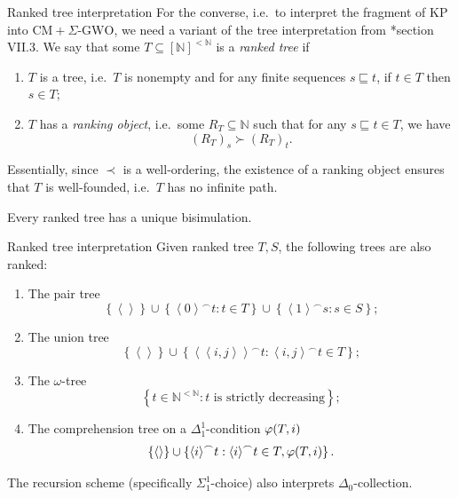 \documentclass{beamer}
\newcommand{\tuple}[1]{\left\langle #1 \right\rangle}
\begin{document}
\begin{frame}{Ranked tree interpretation}
  For the converse, i.e.\ to interpret the fragment of $\mathrm{KP}$ into $\mathrm{CM} + \Sigma\text{-}\mathrm{GWO}$, we need a variant of the tree interpretation from *{section VII.3}. We say that some $T \subseteq \left[\mathbb{N}\right]^{<\mathbb{N}}$ is a \emph{ranked tree} if
  \begin{enumerate}
    \item $T$ is a tree, i.e.\ $T$ is nonempty and for any finite sequences $s \sqsubseteq t$, if $t \in T$ then $s \in T$;
    \item $T$ has a \emph{ranking object}, i.e.\ some $R_T \subseteq \mathbb{N}$ such that for any $s \sqsubseteq t \in T$, we have
          \[\left(R_T\right)_s \succ \left(R_T\right)_t.\]
  \end{enumerate}

  Essentially, since $\prec$ is a well-ordering, the existence of a ranking object ensures that $T$ is well-founded, i.e.\ $T$ has no infinite path.

  \vspace{0.6em}

  \begin{lemma}
    Every ranked tree has a unique bisimulation.
  \end{lemma}
\end{frame}

\begin{frame}{Ranked tree interpretation}
  Given ranked tree $T, S$, the following trees are also ranked:
  \begin{enumerate}
    \item The pair tree
          \[\left\{\tuple{}\right\} \cup \left\{{\tuple{0}}^\frown t : t \in T\right\} \cup \left\{{\tuple{1}}^\frown s : s \in S\right\};\]
    \item The union tree
          \[\left\{\tuple{}\right\} \cup \left\{{\tuple{\tuple{i, j}}}^\frown t : \tuple{i, j}^\frown t \in T\right\};\]
    \item The $\omega$-tree
          \[\left\{t \in \mathbb{N}^{<\mathbb{N}} : \text{$t$ is strictly decreasing}\right\};\]
    \item The comprehension tree on a $\Delta^1_1$-condition $\varphi\mleft(T, i\mright)$
          \[\left\{\tuple{}\right\} \cup \left\{{\tuple{i}}^\frown t : {\tuple{i}}^\frown t \in T, \varphi\mleft(T, i\mright)\right\}.\]
  \end{enumerate}
  The recursion scheme (specifically $\Sigma^1_1$-choice) also interprets $\Delta_0$-collection.
\end{frame}
\end{document}
